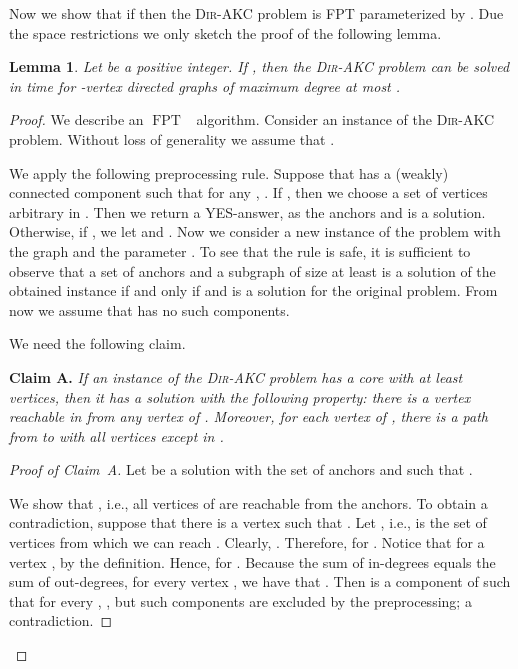 \documentclass[11pt,a4paper]{article}
\newtheorem{lemma}{Lemma}
\DeclareMathOperator{\operatorClassFPT}{FPT}
\newcommand{\classFPT}{\ensuremath{\operatorClassFPT}}
\newcommand{\DAKC}{\textsc{Dir-AKC}\xspace}
\begin{document}
Now we show that if  then the \DAKC problem is FPT parameterized by . Due the space restrictions we only sketch the proof of the following lemma.

\begin{lemma}\label{lem:bound-deg-saved}
Let  be a positive integer. If , then the \DAKC problem can be solved in time  for -vertex directed graphs of maximum degree at most .
\end{lemma}

\begin{proof}
We describe an \classFPT~ algorithm. Consider an instance of the \DAKC problem. Without loss of generality we assume that .

We apply the following preprocessing rule. Suppose that  has a (weakly) connected component  such that for any , . If , then we choose a set  of  vertices arbitrary in
. Then we return a YES-answer, as the anchors  and  is a solution. Otherwise, if , we let  and . Now we consider a new instance of the problem with the graph  and the
parameter . To see that the rule is safe, it is sufficient to observe that a set of anchors  and a subgraph  of
size at least  is a solution of the obtained instance if and only if  and  is a solution for the
original problem. From now we assume that  has no such components.

\medskip

We need the following claim.

\medskip
\noindent
{\bf Claim A.} {\it
If an instance of the \DAKC problem has a core with at least  vertices, then it has a solution
 with the following property: there is a vertex   reachable in  from any vertex of .
Moreover, for each vertex  of , there is a path from  to  with all vertices except  in  .
}



\begin{proof}[Proof of Claim~A]
Let   be a solution with the set of anchors  and such that .

We show that , i.e., all vertices of  are reachable from the anchors. To obtain a contradiction,
suppose that there is a vertex  such that . Let , i.e.,  is the set of
vertices from which we can reach . Clearly, . Therefore,  for .
Notice that for a vertex ,  by the definition. Hence,  for . Because the sum of in-degrees equals the sum of out-degrees, for  every vertex , we have that
. Then  is a component of  such that for every ,
, but such components are excluded by the preprocessing; a contradiction.


\end{proof}
\end{proof}
\end{document}
